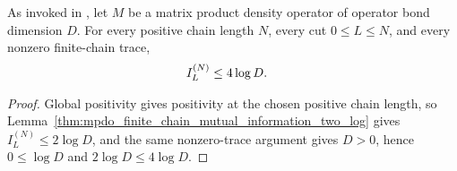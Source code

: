 \begin{lemma}
    \label{thm:mpdo_finite_chain_mutual_information_four_log}
    \leanok
    As invoked in \cite[Proposition~4.5]{Cirac2016MPDO_arXiv}, let $M$ be a
    matrix product density operator of operator bond dimension $D$. For every
    positive chain length $N$, every cut $0\leq L\leq N$, and every nonzero
    finite-chain trace,
    \begin{align}
        I_L^{(N)} & \leq 4\log D.
        \notag
    \end{align}
\end{lemma}

\begin{proof}\leanok
    Global positivity gives positivity at the chosen positive chain
    length, so Lemma~\ref{thm:mpdo_finite_chain_mutual_information_two_log}
    gives $I_L^{(N)}\leq 2\log D$, and the same nonzero-trace argument gives
    $D>0$, hence $0\leq\log D$ and $2\log D\leq4\log D$.
\end{proof}

